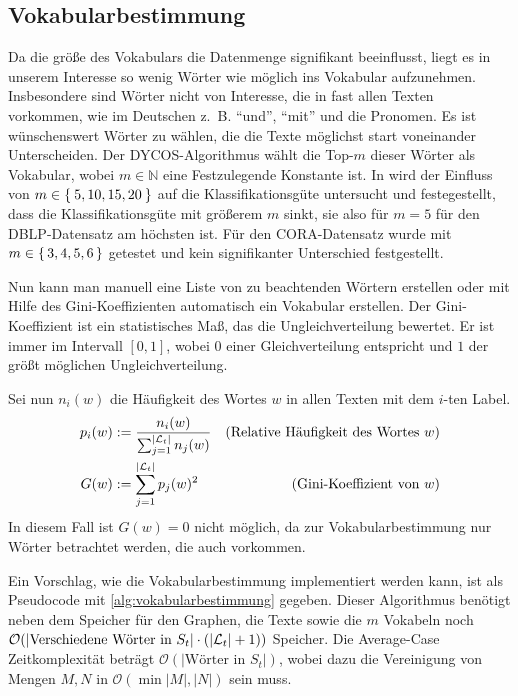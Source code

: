 \subsection{Vokabularbestimmung}\label{sec:vokabularbestimmung}
Da die größe des Vokabulars die Datenmenge signifikant beeinflusst,
liegt es in unserem Interesse so wenig Wörter wie möglich ins
Vokabular aufzunehmen. Insbesondere sind Wörter nicht von Interesse,
die in fast allen Texten vorkommen, wie im Deutschen z.~B.
\enquote{und}, \enquote{mit} und die Pronomen. Es ist wünschenswert
Wörter zu wählen, die die Texte möglichst start voneinander Unterscheiden.
Der DYCOS-Algorithmus wählt die Top-$m$ dieser Wörter als Vokabular,
wobei $m \in \mathbb{N}$ eine Festzulegende Konstante ist. In \cite[S. 365]{aggarwal2011}
wird der Einfluss von $m \in \Set{5,10, 15,20}$ auf die Klassifikationsgüte
untersucht und festegestellt, dass die Klassifikationsgüte mit größerem
$m$ sinkt, sie also für $m=5$ für den DBLP-Datensatz am höchsten ist.
Für den CORA-Datensatz wurde mit $m \in \set{3,4,5,6}$ getestet und 
kein signifikanter Unterschied festgestellt.

Nun kann man manuell eine Liste von zu beachtenden Wörtern erstellen
oder mit Hilfe des Gini-Koeffizienten automatisch ein Vokabular erstellen.
Der Gini-Koeffizient ist ein statistisches Maß, das die Ungleichverteilung
bewertet. Er ist immer im Intervall $[0,1]$, wobei $0$ einer 
Gleichverteilung entspricht und $1$ der größt möglichen Ungleichverteilung.

Sei nun $n_i(w)$ die Häufigkeit des Wortes $w$ in allen Texten mit 
dem $i$-ten Label.
\begin{align}
    p_i(w) &:= \frac{n_i(w)}{\sum_{j=1}^{|\mathcal{L}_t|} n_j(w)} &\text{(Relative Häufigkeit des Wortes $w$)}\\
    G(w)   &:= \sum_{j=1}^{|\mathcal{L}_t|} p_j(w)^2              &\text{(Gini-Koeffizient von $w$)}
\end{align}
In diesem Fall ist $G(w)=0$ nicht möglich, da zur Vokabularbestimmung
nur Wörter betrachtet werden, die auch vorkommen.

Ein Vorschlag, wie die Vokabularbestimmung implementiert werden kann,
ist als Pseudocode mit \cref{alg:vokabularbestimmung}
gegeben. Dieser Algorithmus benötigt neben dem Speicher für den
Graphen, die Texte sowie die $m$ Vokabeln noch $\mathcal{O}(|\text{Verschiedene Wörter in } S_t| \cdot (|\mathcal{L}_t| + 1))$
Speicher. Die Average-Case Zeitkomplexität beträgt 
$\mathcal{O}(|\text{Wörter in } S_t|)$, wobei dazu die Vereinigung
von Mengen $M,N$ in $\mathcal{O}(\min{|M|, |N|})$ sein muss.

